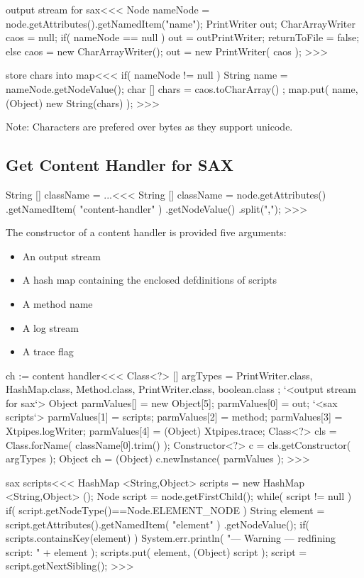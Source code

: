 \documentclass{article}
\begin{document}
{\<output stream for sax\><<<
Node nameNode = node.getAttributes().getNamedItem("name");
PrintWriter out;
CharArrayWriter caos = null;
if( nameNode == null ){
   out = outPrintWriter;
   returnToFile = false;
} else {
   caos = new CharArrayWriter();
   out = new PrintWriter( caos );
}
>>>

\<store chars into map\><<<
if( nameNode != null ){
   String name = nameNode.getNodeValue();
   char [] chars = caos.toCharArray() ;
   map.put( name, (Object) new String(chars) );
}
>>>

Note: Characters are prefered over bytes as they support
unicode.

\subsection{Get Content Handler for SAX}

\<String [] className = ...\><<<
String [] className = node.getAttributes()
                     .getNamedItem( "content-handler" )
                     .getNodeValue()
                     .split(",");
>>>




The constructor of a content handler is provided five arguments:

\begin{itemize}
\item
An output stream
\item
A hash map containing the enclosed defdinitions of scripts 
\item A method name
\item A log stream
\item A trace flag
\end{itemize}


\<ch := content handler\><<<
Class<?> [] argTypes = {
         PrintWriter.class, HashMap.class, Method.class,
         PrintWriter.class, boolean.class }; 
`<output stream for sax`>
Object parmValues[] = new Object[5]; 
parmValues[0] = out; 
`<sax scripts`>  parmValues[1] = scripts; 
parmValues[2] = method; 
parmValues[3] = Xtpipes.logWriter; 
parmValues[4] = (Object) Xtpipes.trace; 
Class<?> cls = Class.forName( className[0].trim() );
Constructor<?> c = cls.getConstructor( argTypes ); 
Object ch = (Object) c.newInstance( parmValues );   
>>>

\<sax scripts\><<<
HashMap <String,Object> scripts = new HashMap <String,Object> ();
Node script = node.getFirstChild();
while( script != null ){ 
  if( script.getNodeType()==Node.ELEMENT_NODE ){
     String element = script.getAttributes().getNamedItem( "element" )
                                       .getNodeValue();
     if( scripts.containsKey(element) ){
        System.err.println( 
           "--- Warning --- redfining script: " + element ); 
     }
     scripts.put( element, (Object) script );
  }
  script = script.getNextSibling();
}
>>>

}
\end{document}
